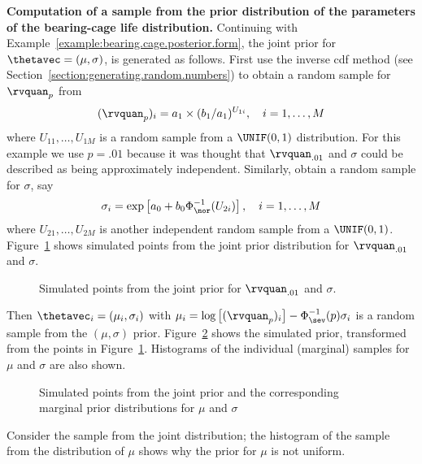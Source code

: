 \begin{example}
\label{example:bearing.cage.prior.compute}
{\bf Computation of a sample from the prior distribution
of the parameters of the bearing-cage life distribution.} Continuing
with Example~\ref{example:bearing.cage.posterior.form}, the joint
prior for $\thetavec=(\mu, \sigma)$, is generated as follows. First
use the inverse cdf method (see
Section~\ref{section:generating.random.numbers}) to obtain a
random sample for $\rvquan_{p}$ from
\begin{displaymath}
(\rvquan_{p})_{i}=a_{1}\times (b_{1}/a_{1})^{U_{1i}},
\quad i=1, \ldots, M
\end{displaymath}
where $U_{11}, \ldots, U_{1M}$ is a random sample from a
$\UNIF(0,1)$ distribution.  For this example we use $p=.01$ because
it was thought that $\rvquan_{.01}$ and $\sigma$ could be described as
being approximately independent.  Similarly, obtain a random
sample for $\sigma$, say
\begin{displaymath}
\sigma_{i}=\exp \left [a_{0}+b_{0} \Phi^{-1}_{\nor}(U_{2i})
	        \right ],
\quad i=1, \ldots, M
\end{displaymath}
where $U_{21}, \ldots, U_{2M}$ is another
independent random sample
from a $\UNIF(0,1)$.
Figure~\ref{figure:q01.sigma.prior2.sim.ps} shows simulated
points from the joint prior distribution for $\rvquan_{.01}$ and $\sigma$.
\begin{figure}
\caption{Simulated points from the 
joint prior for $\rvquan_{.01}$ and $\sigma$.}
\label{figure:q01.sigma.prior2.sim.ps}
\end{figure}
Then $\thetavec_{i}=(\mu_{i}, \sigma_{i})$ with $\mu_{i}=\log \left
[(\rvquan_{p})_{i}\right ]-\Phi^{-1}_{\sev}(p)\sigma_{i}$ is a
random sample from the $(\mu, \sigma)$ prior.
Figure~\ref{figure:mu.sigma.prior2.sim.ps} shows the simulated prior,
transformed from the points in
Figure~\ref{figure:q01.sigma.prior2.sim.ps}.  Histograms of the
individual (marginal) samples for $\mu$ and $\sigma$ are also shown.
\begin{figure}
\caption{Simulated points from the joint prior and 
the corresponding marginal 
	prior distributions for $\mu$ and $\sigma$}
\label{figure:mu.sigma.prior2.sim.ps}
\end{figure}
Consider the sample from the joint distribution; the histogram of
the sample from the distribution of $\mu$ shows why the prior for
$\mu$ is not uniform.
\end{example}

